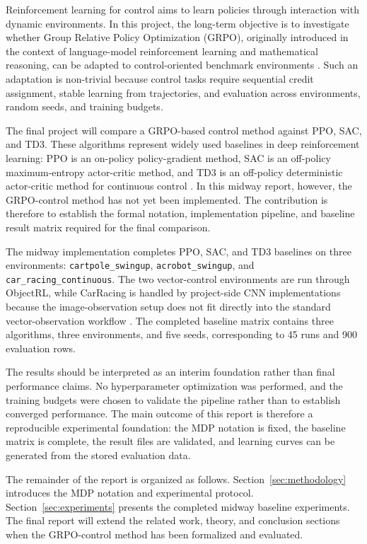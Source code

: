 
Reinforcement learning for control aims to learn policies through interaction with dynamic environments. In this project, the long-term objective is to investigate whether Group Relative Policy Optimization (GRPO), originally introduced in the context of language-model reinforcement learning and mathematical reasoning, can be adapted to control-oriented benchmark environments \citep{shao2024deepseekmath}. Such an adaptation is non-trivial because control tasks require sequential credit assignment, stable learning from trajectories, and evaluation across environments, random seeds, and training budgets.

The final project will compare a GRPO-based control method against PPO, SAC, and TD3. These algorithms represent widely used baselines in deep reinforcement learning: PPO is an on-policy policy-gradient method, SAC is an off-policy maximum-entropy actor-critic method, and TD3 is an off-policy deterministic actor-critic method for continuous control \citep{schulman2017proximal,haarnoja2018sacapps,fujimoto2018td3}. In this midway report, however, the GRPO-control method has not yet been implemented. The contribution is therefore to establish the formal notation, implementation pipeline, and baseline result matrix required for the final comparison.

The midway implementation completes PPO, SAC, and TD3 baselines on three environments: \texttt{cartpole\_swingup}, \texttt{acrobot\_swingup}, and \texttt{car\_racing\_continuous}. The two vector-control environments are run through ObjectRL, while CarRacing is handled by project-side CNN implementations because the image-observation setup does not fit directly into the standard vector-observation workflow \citep{baykal2025objectrl,towers2024gymnasium}. The completed baseline matrix contains three algorithms, three environments, and five seeds, corresponding to 45 runs and 900 evaluation rows.

The results should be interpreted as an interim foundation rather than final performance claims. No hyperparameter optimization was performed, and the training budgets were chosen to validate the pipeline rather than to establish converged performance. The main outcome of this report is therefore a reproducible experimental foundation: the MDP notation is fixed, the baseline matrix is complete, the result files are validated, and learning curves can be generated from the stored evaluation data.

The remainder of the report is organized as follows. Section~\ref{sec:methodology} introduces the MDP notation and experimental protocol. Section~\ref{sec:experiments} presents the completed midway baseline experiments. The final report will extend the related work, theory, and conclusion sections when the GRPO-control method has been formalized and evaluated.
